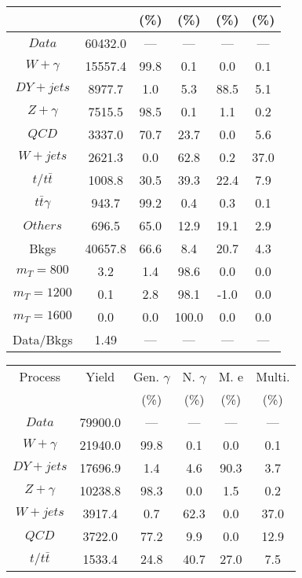 \begin{figure}
\begin{minipage}[c]{0.32\textwidth}
{\begin{tabular}{cccccc}
 &  & (\%) & (\%) & (\%) & (\%)  \\
\hline
                                                                      $ Data $ &  60432.0 &  --- &  --- &  --- &  ---\\
$ W+\gamma $ &  15557.4 &  99.8 &  0.1 &  0.0 &  0.1\\
$ DY+jets $ &  8977.7 &  1.0 &  5.3 &  88.5 &  5.1\\
$ Z+\gamma $ &  7515.5 &  98.5 &  0.1 &  1.1 &  0.2\\
$ QCD $ &  3337.0 &  70.7 &  23.7 &  0.0 &  5.6\\
$ W+jets $ &  2621.3 &  0.0 &  62.8 &  0.2 &  37.0\\
$ t/t\bar{t} $ &  1008.8 &  30.5 &  39.3 &  22.4 &  7.9\\
$ t\bar{t}\gamma $ &  943.7 &  99.2 &  0.4 &  0.3 &  0.1\\
$ Others $ &  696.5 &  65.0 &  12.9 &  19.1 &  2.9\\
Bkgs &  40657.8 &  66.6 &  8.4 &  20.7 &  4.3\\
$ m_{T} = 800 $ &  3.2 &  1.4 &  98.6 &  0.0 &  0.0\\
$ m_{T} = 1200 $ &  0.1 &  2.8 &  98.1 &  -1.0 &  0.0\\
$ m_{T} = 1600 $ &  0.0 &  0.0 &  100.0 &  0.0 &  0.0\\
Data/Bkgs &  1.49 &  --- &  --- &  --- &  ---\\
\hline
\end{tabular}
}
\end{minipage}
\begin{minipage}[c]{0.32\textwidth}
\centering
\tiny{
\begin{tabular}{cccccc}
\hline
Process & Yield & Gen. $\gamma$ & N. $\gamma$ & M. e & Multi. \\
 &  & (\%) & (\%) & (\%) & (\%)  \\
\hline
                                                                      $ Data $ &  79900.0 &  --- &  --- &  --- &  ---\\
$ W+\gamma $ &  21940.0 &  99.8 &  0.1 &  0.0 &  0.1\\
$ DY+jets $ &  17696.9 &  1.4 &  4.6 &  90.3 &  3.7\\
$ Z+\gamma $ &  10238.8 &  98.3 &  0.0 &  1.5 &  0.2\\
$ W+jets $ &  3917.4 &  0.7 &  62.3 &  0.0 &  37.0\\
$ QCD $ &  3722.0 &  77.2 &  9.9 &  0.0 &  12.9\\
$ t/t\bar{t} $ &  1533.4 &  24.8 &  40.7 &  27.0 &  7.5\\

\end{tabular}}
\end{minipage}
\end{figure}
